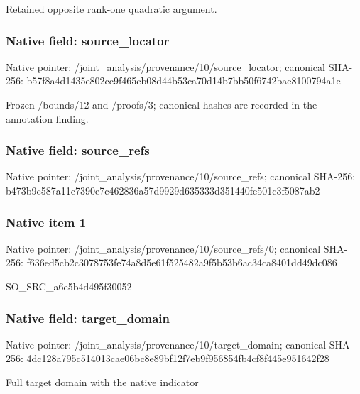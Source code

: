 \documentclass[10pt,a4paper]{article}
\begin{document}
\begingroup\raggedright\sloppy Retained opposite rank-one quadratic argument.\par\endgroup

\subsubsection{Native field: source\_\allowbreak{}locator}
Native pointer: /joint\_\allowbreak{}analysis/provenance/10/source\_\allowbreak{}locator; canonical SHA-256: b57f8a4d1435e802cc9f465cb08d44b53ca70d14b7bb50f6742bae8100794a1e

\begingroup\raggedright\sloppy Frozen /\allowbreak{}bounds/\allowbreak{}12 and /\allowbreak{}proofs/\allowbreak{}3;\allowbreak{} canonical hashes are recorded in the annotation finding.\par\endgroup

\subsubsection{Native field: source\_\allowbreak{}refs}
Native pointer: /joint\_\allowbreak{}analysis/provenance/10/source\_\allowbreak{}refs; canonical SHA-256: b473b9c587a11c7390e7c462836a57d9929d635333d351440fe501c3f5087ab2

\subsubsection{Native item 1}
Native pointer: /joint\_\allowbreak{}analysis/provenance/10/source\_\allowbreak{}refs/0; canonical SHA-256: f636ed5cb2c3078753fe74a8d5e61f525482a9f5b53b6ac34ca8401dd49dc086

\begingroup\raggedright\sloppy SO\_\allowbreak{}SRC\_\allowbreak{}a6e5b4d495f30052\par\endgroup

\subsubsection{Native field: target\_\allowbreak{}domain}
Native pointer: /joint\_\allowbreak{}analysis/provenance/10/target\_\allowbreak{}domain; canonical SHA-256: 4dc128a795c514013cae06bc8e89bf12f7eb9f956854fb4cf8f445e951642f28

\begingroup\raggedright\sloppy Full target domain with the native indicator\par\endgroup
\end{document}
